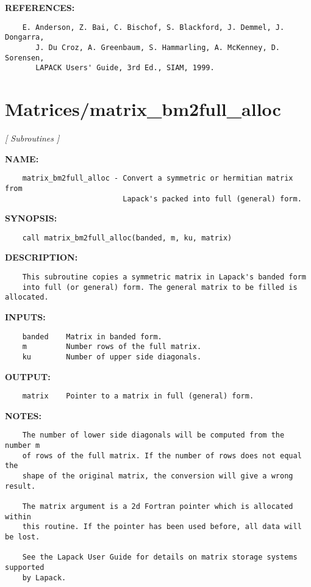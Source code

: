 \textbf{REFERENCES:}\hspace{0.08in}\begin{Verbatim}
    E. Anderson, Z. Bai, C. Bischof, S. Blackford, J. Demmel, J. Dongarra,
       J. Du Croz, A. Greenbaum, S. Hammarling, A. McKenney, D. Sorensen,
       LAPACK Users' Guide, 3rd Ed., SIAM, 1999.
\end{Verbatim}
\section{Matrices/matrix\_bm2full\_alloc}
\textsl{[ Subroutines ]}

\label{ch:robo17}
\label{ch:Matrices_matrix_bm2full_alloc}
\textbf{NAME:}\hspace{0.08in}\begin{Verbatim}
    matrix_bm2full_alloc - Convert a symmetric or hermitian matrix from 
                           Lapack's packed into full (general) form.
\end{Verbatim}
\textbf{SYNOPSIS:}\hspace{0.08in}\begin{Verbatim}
    call matrix_bm2full_alloc(banded, m, ku, matrix)
\end{Verbatim}
\textbf{DESCRIPTION:}\hspace{0.08in}\begin{Verbatim}
    This subroutine copies a symmetric matrix in Lapack's banded form 
    into full (or general) form. The general matrix to be filled is allocated.
\end{Verbatim}
\textbf{INPUTS:}\hspace{0.08in}\begin{Verbatim}
    banded    Matrix in banded form.
    m         Number rows of the full matrix.
    ku        Number of upper side diagonals.
\end{Verbatim}
\textbf{OUTPUT:}\hspace{0.08in}\begin{Verbatim}
    matrix    Pointer to a matrix in full (general) form.
\end{Verbatim}
\textbf{NOTES:}\hspace{0.08in}\begin{Verbatim}
    The number of lower side diagonals will be computed from the number m
    of rows of the full matrix. If the number of rows does not equal the
    shape of the original matrix, the conversion will give a wrong result.

    The matrix argument is a 2d Fortran pointer which is allocated within
    this routine. If the pointer has been used before, all data will be lost.

    See the Lapack User Guide for details on matrix storage systems supported 
    by Lapack. 
\end{Verbatim}
